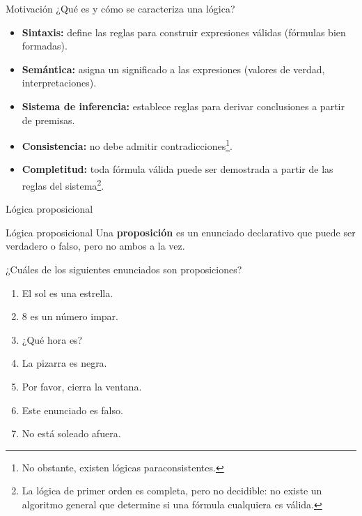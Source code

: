 \documentclass{beamer}
\begin{document}
\begin{frame}{Motivación}
  ¿Qué es y cómo se caracteriza una lógica?
  \begin{itemize}
    \item \textbf{Sintaxis:} define las reglas para construir expresiones
          válidas (fórmulas bien formadas).
    \item \textbf{Semántica:} asigna un significado a las expresiones (valores
          de verdad, interpretaciones).
    \item \textbf{Sistema de inferencia:} establece reglas para derivar
          conclusiones a partir de premisas.
    \item \textbf{Consistencia:} no debe admitir contradicciones\footnote{No
          obstante, existen lógicas paraconsistentes.}.
    \item \textbf{Completitud:} toda fórmula válida puede ser demostrada a
          partir de las reglas del sistema\footnote{La lógica de primer orden es
          completa, pero no decidible: no existe un algoritmo general que
          determine si una fórmula cualquiera es válida.}.
  \end{itemize}
\end{frame}


\begin{frame}[plain,c]
  \vspace{1cm}
  \begin{center}
    \Huge Lógica proposicional
  \end{center}
\end{frame}


\begin{frame}{Lógica proposicional}
  Una \textbf{proposición} es un enunciado declarativo que puede ser verdadero o
  falso, pero no ambos a la vez.

  ¿Cuáles de los siguientes enunciados son proposiciones?

  \begin{enumerate}[<+->]
    \item El sol es una estrella.
    \item 8 es un número impar.
    \item ¿Qué hora es?
    \item La pizarra es negra.
    \item Por favor, cierra la ventana.
    \item Este enunciado es falso.
    \item No está soleado afuera.
  \end{enumerate}
\end{frame}
\end{document}
